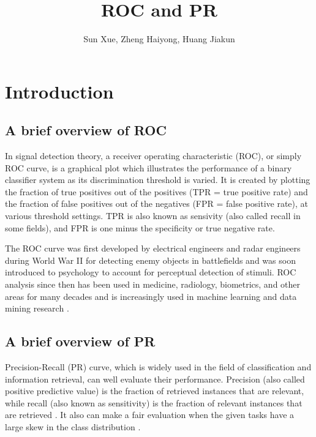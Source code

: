 \documentclass[a4paper,12pt]{article}
\author{Sun Xue, Zheng Haiyong, Huang Jiakun}
\title{ROC and PR}
\begin{document}
\maketitle
\tableofcontents
\newpage

\section{Introduction}

\subsection{A brief overview of ROC}
In signal detection theory, a receiver operating characteristic (ROC), or simply ROC curve, is a graphical plot which illustrates the performance of a binary classifier system as its discrimination threshold is varied. It is created by plotting the fraction of true positives out of the positives (TPR = true positive rate) and the fraction of false positives out of the negatives (FPR = false positive rate), at various threshold settings. TPR is also known as sensivity (also called recall in some fields), and FPR is one minus the specificity or true negative rate.

The ROC curve was first developed by electrical engineers and radar engineers during World War II for detecting enemy objects in battlefields and was soon introduced to psychology to account for perceptual detection of stimuli. ROC analysis since then has been used in medicine, radiology, biometrics, and other areas for many decades and is increasingly used in machine learning and data mining research \cite{1:misc}.

\subsection{A brief overview of PR}

Precision-Recall (PR) curve, which is widely used in the field of classification and information retrieval, can well evaluate their performance. Precision (also called positive predictive value) is the fraction of retrieved instances that are relevant, while recall (also known as sensitivity) is the fraction of relevant instances that are retrieved \cite{2:misc}. It also can make a fair evaluation when the given tasks have a large skew in the class distribution \cite{3:article}.
\end{document}
